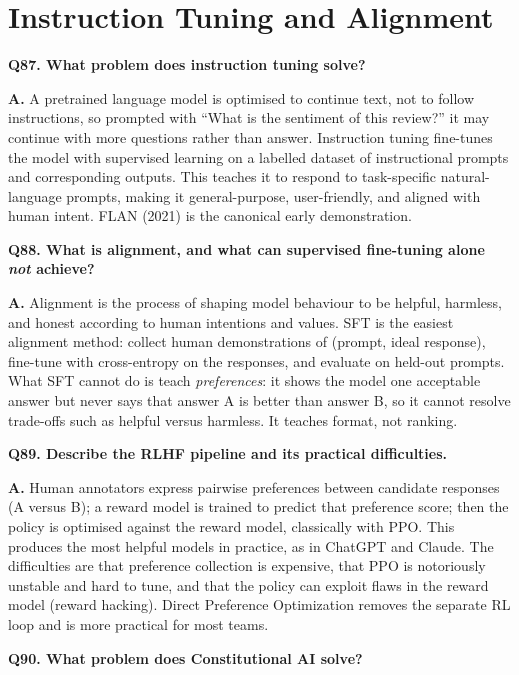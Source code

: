\documentclass[11pt]{article}
\begin{document}
\section{Instruction Tuning and Alignment}

\noindent\textbf{Q87. What problem does instruction tuning solve?}

\noindent\textbf{A.} A pretrained language model is optimised to continue text, not to follow instructions, so prompted with ``What is the sentiment of this review?'' it may continue with more questions rather than answer. Instruction tuning fine-tunes the model with supervised learning on a labelled dataset of instructional prompts and corresponding outputs. This teaches it to respond to task-specific natural-language prompts, making it general-purpose, user-friendly, and aligned with human intent. FLAN (2021) is the canonical early demonstration.

\medskip
\noindent\textbf{Q88. What is alignment, and what can supervised fine-tuning alone \emph{not} achieve?}

\noindent\textbf{A.} Alignment is the process of shaping model behaviour to be helpful, harmless, and honest according to human intentions and values. SFT is the easiest alignment method: collect human demonstrations of (prompt, ideal response), fine-tune with cross-entropy on the responses, and evaluate on held-out prompts. What SFT cannot do is teach \emph{preferences}: it shows the model one acceptable answer but never says that answer A is better than answer B, so it cannot resolve trade-offs such as helpful versus harmless. It teaches format, not ranking.

\medskip
\noindent\textbf{Q89. Describe the RLHF pipeline and its practical difficulties.}

\noindent\textbf{A.} Human annotators express pairwise preferences between candidate responses (A versus B); a reward model is trained to predict that preference score; then the policy is optimised against the reward model, classically with PPO. This produces the most helpful models in practice, as in ChatGPT and Claude. The difficulties are that preference collection is expensive, that PPO is notoriously unstable and hard to tune, and that the policy can exploit flaws in the reward model (reward hacking). Direct Preference Optimization removes the separate RL loop and is more practical for most teams.

\medskip
\noindent\textbf{Q90. What problem does Constitutional AI solve?}
\end{document}
